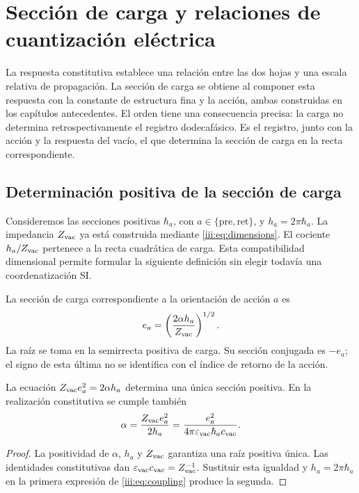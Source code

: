 \section{Sección de carga y relaciones de cuantización eléctrica}
\label{iii:sec:carga}

La respuesta constitutiva establece una relación entre las dos hojas y una
escala relativa de propagación. La sección de carga se obtiene al componer
esta respuesta con la constante de estructura fina y la acción, ambas
construidas en los capítulos antecedentes. El orden tiene una consecuencia
precisa: la carga no determina retrospectivamente el registro dodecafásico.
Es el registro, junto con la acción y la respuesta del vacío, el que
determina la sección de carga en la recta correspondiente.

\subsection{Determinación positiva de la sección de carga}

Consideremos las secciones positivas $\hbar_a$, con
$a\in\{\mathrm{pre},\mathrm{ret}\}$, y $h_a=2\pi\hbar_a$.
La impedancia $Z_{\rm vac}$ ya está construida mediante
\eqref{iii:eq:dimensions}. El cociente $h_a/Z_{\rm vac}$ pertenece a
la recta cuadrática de carga. Esta compatibilidad dimensional permite
formular la siguiente definición sin elegir todavía una coordenatización SI.

\begin{definition}
La sección de carga correspondiente a la orientación de acción $a$ es
\begin{equation}
 e_a=\left(\frac{2\alpha h_a}{Z_{\rm vac}}\right)^{1/2}.
 \label{iii:eq:charge}
\end{equation}
La raíz se toma en la semirrecta positiva de carga. Su sección conjugada
es $-e_a$; el signo de esta última no se identifica con el índice de
retorno de la acción.
\end{definition}

\begin{proposition}
La ecuación $Z_{\rm vac}e_a^2=2\alpha h_a$ determina una única sección
positiva. En la realización constitutiva se cumple también
\begin{equation}
 \alpha=\frac{Z_{\rm vac}e_a^2}{2h_a}
 =\frac{e_a^2}{4\pi\varepsilon_{\rm vac}\hbar_a c_{\rm vac}}.
 \label{iii:eq:coupling}
\end{equation}
\end{proposition}
\begin{proof}
La positividad de $\alpha$, $h_a$ y $Z_{\rm vac}$ garantiza una raíz
positiva única. Las identidades constitutivas dan
$\varepsilon_{\rm vac}c_{\rm vac}=Z_{\rm vac}^{-1}$.
Sustituir esta igualdad y $h_a=2\pi\hbar_a$ en la primera expresión
de \eqref{iii:eq:coupling} produce la segunda.
\end{proof}

